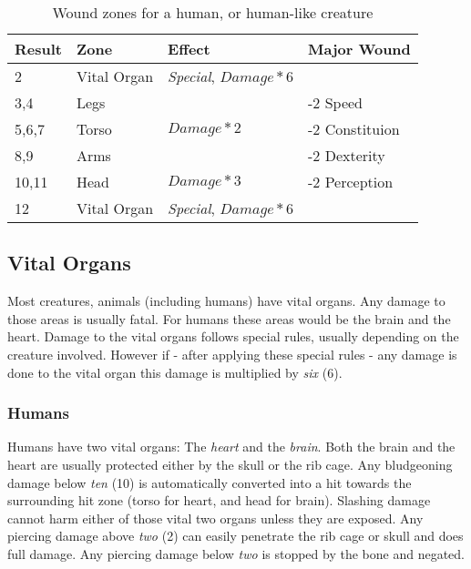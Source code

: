 \begin{table}
  \caption{Wound zones for a human, or human-like creature}
  \begin{center}
    \begin{tabular}{|l|l|l|l|}
      \hline
      Result& Zone         & Effect                           & Major Wound     \\ \hline
      2     & Vital Organ  & \emph{Special}, \(Damage * 6\)   &                 \\ \hline
      3,4   & Legs         &                                  & -2 Speed        \\ \hline
      5,6,7 & Torso        & \(Damage * 2\)                   & -2 Constituion  \\ \hline
      8,9   & Arms         &                                  & -2 Dexterity    \\ \hline
      10,11 & Head         & \(Damage * 3\)                   & -2 Perception   \\ \hline
      12    & Vital Organ  & \emph{Special}, \(Damage * 6\)   &                 \\
      \hline
    \end{tabular}
  \end{center}
\end{table}

\subsection{Vital Organs}
\label{sub:6-Vital Organs}

Most creatures, animals (including humans) have vital organs. Any damage
to those areas is usually fatal. For humans these areas would be the brain
and the heart. Damage to the vital organs follows special rules, usually
depending on the creature involved. However if - after applying these special
rules - any damage is done to the vital organ this damage is multiplied by
\emph{six} (6).

\subsubsection{Humans}
\label{subs:6-Humans}

Humans have two vital organs: The \emph{heart} and the \emph{brain}. Both
the brain and the heart are usually protected either by the skull or the
rib cage. Any bludgeoning damage below \emph{ten} (10) is automatically
converted into a hit towards the surrounding hit zone (torso for
heart, and head for brain). Slashing damage cannot harm either of those
vital two organs unless they are exposed. Any piercing damage above \emph{two}
(2) can easily penetrate the rib cage or skull and does full damage. Any
piercing damage below \emph{two} is stopped by the bone and negated.
